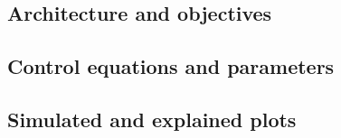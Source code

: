 \subsection{Architecture and objectives}

\subsection{Control equations and parameters}

\subsection{Simulated and explained plots}

